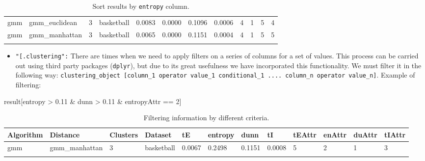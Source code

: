 \documentclass[
]{article}
\newenvironment{Shaded}{\begin{snugshade}}{\end{snugshade}}
\newcommand{\DecValTok}[1]{\textcolor[rgb]{0.00,0.00,0.81}{#1}}
\newcommand{\FloatTok}[1]{\textcolor[rgb]{0.00,0.00,0.81}{#1}}
\newcommand{\NormalTok}[1]{#1}
\newcommand{\SpecialCharTok}[1]{\textcolor[rgb]{0.00,0.00,0.00}{#1}}
\providecommand{\tightlist}{%
  \setlength{\itemsep}{0pt}\setlength{\parskip}{0pt}}
\begin{document}
\begin{longtable}{| p{1.1cm} | p{2cm} | p{0.8cm} | p{1.3cm} | p{0.60cm} | p{0.7cm} | p{0.65cm} | p{0.65cm} | p{0.65cm} | p{0.65cm} | p{0.7cm} | p{0.65cm} |}
\cline{2-12}
\scriptsize gmm & \scriptsize gmm\_euclidean & \scriptsize 3 & \scriptsize basketball & \scriptsize 0.0083 & \scriptsize 0.0000 & \scriptsize 0.1096 & \scriptsize 0.0006 & \scriptsize 4 & \scriptsize 1 & \scriptsize 5 & \scriptsize 4 \\
\cline{2-12}
\scriptsize gmm & \scriptsize gmm\_manhattan & \scriptsize 3 & \scriptsize basketball & \scriptsize 0.0065 & \scriptsize 0.0000 & \scriptsize 0.1151 & \scriptsize 0.0004 & \scriptsize 4 & \scriptsize 1 & \scriptsize 5 & \scriptsize 5 \\
\hline
\caption{Sort results by \texttt{entropy} column.}
\label{tab:resultsorting}
\end{longtable}

\begin{itemize}
\tightlist
\item
  \texttt{"[.clustering":} There are times when we need to apply filters
  on a series of columns for a set of values. This process can be
  carried out using third party packages (\texttt{dplyr}), but due to
  its great usefulness we have incorporated this functionality. We must
  filter it in the following way:
  \texttt{clustering\_object [column\_1 operator value\_1 conditional\_1 .... column\_n operator value\_n]}.
  Example of filtering:
\end{itemize}

\begin{Shaded}
\begin{Highlighting}[]
\NormalTok{result[entropy }\SpecialCharTok{\textgreater{}} \FloatTok{0.11} \SpecialCharTok{\&}\NormalTok{ dunn }\SpecialCharTok{\textgreater{}} \FloatTok{0.11} \SpecialCharTok{\&}\NormalTok{ entropyAttr }\SpecialCharTok{==} \DecValTok{2}\NormalTok{]}
\end{Highlighting}
\end{Shaded}

\begin{longtable}{| p{1.1cm} | p{2cm} | p{0.8cm} | p{1.3cm} | p{0.60cm} | p{0.7cm} | p{0.65cm} | p{0.65cm} | p{0.65cm} | p{0.65cm} | p{0.7cm} | p{0.65cm} |}
\hline
\scriptsize  Algorithm & \scriptsize  Distance  &  \scriptsize Clusters & \scriptsize  Dataset & \scriptsize tE & \scriptsize entropy & \scriptsize  dunn  & \scriptsize tI & \scriptsize tEAttr & \scriptsize enAttr & \scriptsize duAttr & \scriptsize tIAttr  \\
\hline
\scriptsize    gmm     & \scriptsize  gmm\_manhattan & \scriptsize      3  & \scriptsize   basketball  & \scriptsize   0.0067  & \scriptsize  0.2498  & \scriptsize 0.1151  & \scriptsize    0.0008     & \scriptsize     5       & \scriptsize       2    & \scriptsize      1      & \scriptsize      3 \\
\hline
\caption{Filtering information by different criteria.}
\label{tab:filtering}
\end{longtable}
\end{document}
